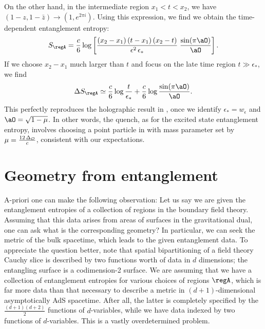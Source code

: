 \documentclass[12pt,openany]{book}
\begin{document}
On the other hand, in the intermediate region $x_1<t<x_2$, we have $(1-z,1-\bar{z})\to (1,e^{2\pi i})$. Using this expression, we find we obtain the time-dependent entanglement entropy:
%
\begin{equation}
S_\regA=\frac{c}{6}\log \left[\frac{(x_2-x_1) \, (t-x_1)\, (x_2-t)}{\epsilon^2\, \epsilon_*}  \;\frac{\sin(\pi\aO)}{\aO}\right].
\end{equation}
%
If we choose $x_2-x_1$ much larger than $t$ and focus on the late time region $t\gg \epsilon_*$, we find
%
\begin{equation}
\Delta S_\regA\simeq \frac{c}{6}\log\frac{t}{\epsilon_*}+\frac{c}{6}\log\frac{\sin(\pi\aO)}{\aO}.
\end{equation}
%
This perfectly reproduces the  holographic result in \cite{Nozaki:2013wia}, once we identify $\epsilon_*=w_\epsilon$ and $\aO=\sqrt{1-\mu}$.
In other words, the quench, as for the excited state entanglement entropy, involves choosing a point particle in  with mass parameter set by $\mu =  \frac{12\,\Delta_{\cal O}}{c}$, consistent with our expectations.




\chapter{Geometry from entanglement}
\label{sec:egeometry}


A-priori one can make the following observation: Let us say we are given the entanglement entropies of a collection of regions in the boundary field theory. Assuming that this data arises from areas of surfaces in the gravitational dual, one can ask what is the corresponding geometry? In particular,  we can seek the metric of the bulk spacetime, which leads to the given entanglement data. To appreciate the question better, note that  spatial bipartitioning of a field theory Cauchy slice is described by two functions worth of data in $d$ dimensions;  the entangling surface is a codimension-2 surface. We are assuming that we have a collection of entanglement entropies for various choices of regions $\regA$, which is far more data than that necessary to describe a metric in $(d+1)$-dimensional asymptotically AdS spacetime. After all, the latter is completely specified by the $\frac{(d+1)(d+2)}{2}$ functions of $d$-variables, while we have data indexed by two functions of $d$-variables. This is a vastly overdetermined problem.
\end{document}
